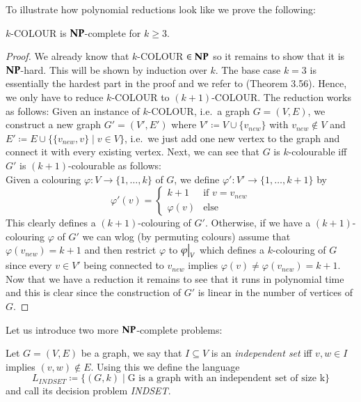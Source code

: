 To illustrate how polynomial reductions look like we prove the following:

\begin{Theorem}
  $k$-COLOUR is $\mathbf{NP}$-complete for $k \geq 3$.
\end{Theorem}

\begin{proof}
 We already know that $k$-COLOUR $\in \mathbf{NP}$ so it remains to show that it is $\mathbf{NP}$-hard.
 This will be shown by induction over $k$.
 The base case $k = 3$ is essentially the hardest part in the proof and we refer to \cite{JorgRothe2008} (Theorem 3.56).
 Hence, we only have to reduce $k$-COLOUR to $(k+1)$-COLOUR. The reduction works as follows: \newline
 Given an instance of $k$-COLOUR, i.e.\ 
 a graph $G = (V,E)$, we construct a new graph $G' = (V', E')$ where $V' \coloneqq V \cup \lbrace v_{new} \rbrace$ with
 $v_{new} \notin V$ and $E' \coloneqq E \cup \lbrace \lbrace v_{new}, v \rbrace \; | \; v \in V \rbrace$, i.e.\ we just add one new vertex to the graph
 and connect it with every existing vertex. Next, we can see that $G$ is $k$-colourable iff $G'$ is $(k+1)$-colourable as follows: \\
 Given a colouring $\varphi \colon V \to {\lbrace 1,\ldots,k \rbrace}$ of $G$, we define 
 $\varphi' \colon V' \to { \lbrace 1, \ldots, k+1 \rbrace }$
 by 
 $$ \varphi'(v) = \begin{cases}
                   k + 1 &\text{if $v = v_{new}$} \\
                   \varphi(v) &\text{else}
                  \end{cases}
$$
 This clearly defines a $(k+1)$-colouring of $G'$. Otherwise, if we have a $(k+1)$-colouring $\varphi$ of 
 $G'$ we can wlog (by permuting colours) assume that $\varphi (v_{new}) = k+1$ and then
 restrict $\varphi$ to $\restr{\varphi}{V}$ which defines a $k$-colouring of $G$ since every $v \in V'$ being connected
 to $v_{new}$ implies $\varphi(v) \neq \varphi(v_{new}) = k+1$. \\
 Now that we have a reduction it remains to see that it runs in polynomial time and this is clear since
 the construction of $G'$ is linear in the number of vertices of $G$.
 
\end{proof}

Let us introduce two more $\mathbf{NP}$-complete problems:
\begin{Problem}
 Let $G = (V,E)$ be a graph, we say that $I \subseteq V$ is an \emph{independent set} iff 
  $v,w \in I$ implies $(v,w) \notin E$. Using this we define the language
  $$L_{INDSET} \coloneqq \lbrace (G,k) \; | \; \text{G is a graph with an independent set of size k} \rbrace $$
  and call its decision problem \emph{INDSET}.
\end{Problem}

